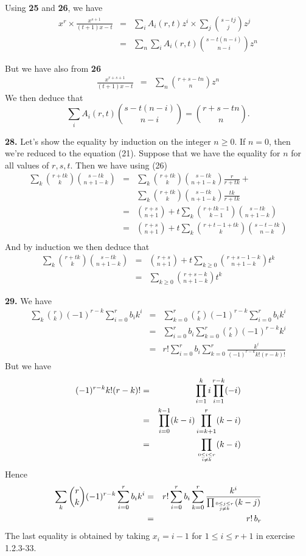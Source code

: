 \documentclass[a4paper,12pt]{article}
\newcommand{\newpar}[1]{\bigskip \noindent \textbf{#1.}}
\begin{document}
Using \textbf{25} and \textbf{26}, we have
\begin{eqnarray*}
  x^r \times \frac{x^{s+1}}{(t+1)x-t} &=& \sum_i A_i(r,t) z^i \times
  \sum_j {{s-tj} \choose j} z^j \\
  &=& \sum_n \sum_i A_i(r,t) {{s-t(n-i)} \choose {n-i}} z^n
\end{eqnarray*}

But we have also from \textbf{26}
\begin{eqnarray*}
  \frac{x^{r+s+1}}{(t+1)x-t} &=& \sum_n {{r+s-tn} \choose n} z^n
\end{eqnarray*}
We then deduce that
\[ \sum_i A_i(r,t) {{s-t(n-i)} \choose {n-i}} = {{r+s-tn} \choose n}.\]

\newpar{28}  Let's show the equality by induction on the integer $n
\ge 0$.  If $n=0$, then we're reduced to the equation (21).  Suppose
that we have the equality for $n$ for all values of $r,s,t$.  Then we
have using (26)
\begin{eqnarray*}
  \sum_k {r+tk \choose k}{s-tk\choose n+1-k} &=&
  \sum_k {r+tk \choose k}{s-tk\choose n+1-k}\frac{r}{r+tk} +\\
  && \sum_k {r+tk \choose k}{s-tk\choose n+1-k}\frac{tk}{r+tk} \\
  &=& {r + s \choose n+1} + t \sum_k {r+tk-1 \choose k-1}{s-tk \choose
    n+1-k} \\
  &=& {r+s \choose n+1} + t \sum_k {r+t-1 + tk \choose k}{s-t-tk
    \choose n-k} \\
\end{eqnarray*}
And by induction we then deduce that
\begin{eqnarray*}
\sum_k {r+tk \choose k}{s-tk\choose n+1-k}  &=& {r+s \choose n+1} + t
\sum_{k\ge 0} {r+s-1-k\choose n+1-k} t^k \\
&=& \sum_{k\ge 0} {r+s-k \choose n+1-k} t^k
\end{eqnarray*}

\newpar{29} We have
\begin{eqnarray*}
  \sum_k {r \choose k} (-1)^{r-k} \sum_{i=0}^r b_i k^i &=&
  \sum_{k=0}^r {r \choose k} (-1)^{r-k} \sum_{i=0}^r b_i k^i \\
  &=& \sum_{i=0}^r b_i \sum_{k=0}^r {r \choose k} (-1)^{r-k} k^i \\
  &=& r! \sum_{i=0}^r b_i \sum_{k=0}^r \frac{k^i}{(-1)^{r-k}k!(r-k)!}
\end{eqnarray*}
But we have
\begin{eqnarray*}
  (-1)^{r-k}k! (r-k)! &=& \prod_{i=1}^k i \prod_{i=1}^{r-k}(-i) \\
  &=& \prod_{i=0}^{k-1} (k-i) \prod_{i=k+1}^r (k-i) \\
  &=& \prod_{0\le i \le r \atop i\not=k} (k-i)
\end{eqnarray*}
Hence
\begin{eqnarray*}
  \sum_k {r \choose k} (-1)^{r-k} \sum_{i=0}^r b_i k^i &=& r!
  \sum_{i=0}^r b_i \sum_{k=0}^r \frac{k^i}{\prod_{0\le j \le r\atop
      j\not=k} (k-j)} \\
  &=& r!\,b_r
\end{eqnarray*}
The last equality is obtained by taking $x_i = i-1$ for $1\le i\le
r+1$ in exercise 1.2.3-33.
\end{document}
